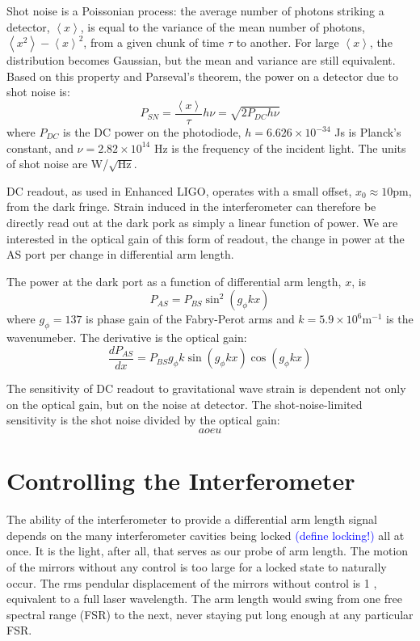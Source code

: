 Shot noise is a Poissonian process: the average number of photons
striking a detector, $\left<x\right>$, is equal to the variance of the
mean number of photons, $\left<x^2\right> - \left<x\right>^2$, from a
given chunk of time $\tau$ to another. For large $\left<x\right>$, the
distribution becomes Gaussian, but the mean and variance are still
equivalent. Based on this property and Parseval's theorem, the power
on a detector due to shot noise is:
\begin{equation}
P_{SN} = \frac{\left<x\right>}{\tau} h \nu = \sqrt{2 P_{DC} h \nu}
\end{equation}
where $P_{DC}$ is the DC power on the photodiode, $h = 6.626 \times
10^{-34}$ Js is Planck's constant, and $\nu = 2.82 \times 10^{14}$ Hz
is the frequency of the incident light. The units of shot noise are
W/$\sqrt{\mathrm{Hz}}$.

DC readout, as used in Enhanced LIGO, operates with a small offset,
$x_0 \approx 10 \mathrm{pm}$, from the dark fringe. Strain induced in the
interferometer can therefore be directly read out at the dark pork as
simply a linear function of power. We are interested in the optical
gain of this form of readout, the change in power at the AS port per
change in differential arm length. 

The power at the dark port as a function of differential arm length,
$x$, is
\begin{equation}
P_{AS} = P_{BS} \sin^2{(g_{\phi}kx)}
\end{equation}
where $g_{\phi} = 137$ is phase gain of the Fabry-Perot arms and
$k=5.9\times10^6 \mathrm{m}^{-1}$ is the wavenumeber. The derivative
is the optical gain:
\begin{equation}
\frac{dP_{AS}}{dx} = P_{BS} g_{\phi} k \sin{(g_{\phi}kx)} \cos{(g_{\phi}kx)}
\end{equation}

The sensitivity of DC readout to gravitational wave strain is
dependent not only on the optical gain, but on the noise at
detector. The shot-noise-limited sensitivity is the shot noise divided
by the optical gain:
\begin{equation}
aoeu
\end{equation}





\section{Controlling the Interferometer}
The ability of the interferometer to provide a differential arm length
signal depends on the many interferometer cavities being locked
\textcolor{blue}{(define locking!)} all at once. It is the light,
after all, that serves as our probe of arm length. The motion of the
mirrors without any control is too large for a locked state to
naturally occur. The rms pendular displacement of the mirrors without
control is 1 \micron, equivalent to a full laser wavelength. The arm
length would swing from one free spectral range (FSR) to the next,
never staying put long enough at any particular FSR.

